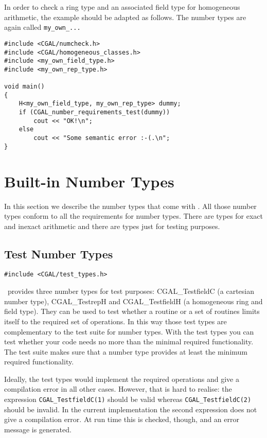 \documentclass[]{article}
\begin{document}
In order to check a ring type and an associated field type for
homogeneous arithmetic, the example should be adapted as follows.
The number types are again called \verb~my_own_...~
\begin{verbatim}
#include <CGAL/numcheck.h>
#include <CGAL/homogeneous_classes.h>
#include <my_own_field_type.h>
#include <my_own_rep_type.h>

void main()
{
    H<my_own_field_type, my_own_rep_type> dummy;
    if (CGAL_number_requirements_test(dummy))
        cout << "OK!\n";
    else
        cout << "Some semantic error :-(.\n";
}
\end{verbatim}


\section{Built-in Number Types}

In this section we describe the number types that come with \cgal.
All those number types conform to all the requirements for number types.
There are types for exact and inexact arithmetic and there are types just for
testing purposes.


\subsection{Test Number Types}

\begin{verbatim}
#include <CGAL/test_types.h>
\end{verbatim}

\cgal\ provides three number types for test purposes: CGAL\_TestfieldC (a
cartesian number type), CGAL\_TestrepH and CGAL\_TestfieldH (a homogeneous
ring and field type).
They can be used to test whether a routine or
a set of routines limits itself to the required set of operations.
In this way those test types are complementary to the test suite for number
types. With the test types you can test whether your code needs no more than
the minimal required functionality. The test suite makes sure that a number
type provides at least the minimum required functionality.

Ideally, the test types would implement the required operations and give a
compilation error in all other cases. However, that is hard to realise:
the expression \verb~CGAL_TestfieldC(1)~ should be valid whereas
\verb~CGAL_TestfieldC(2)~ should be invalid. In the current implementation the
second expression does not give a compilation error. At run time this is
checked, though, and an error message is generated.
\end{document}
